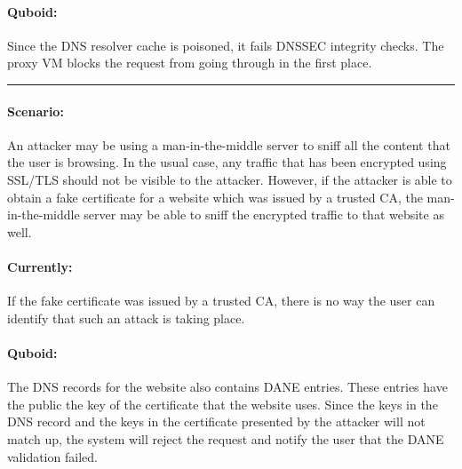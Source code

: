 \paragraph{Quboid:} Since the DNS resolver cache is poisoned, it fails DNSSEC integrity checks. The proxy VM blocks the request from going through in the first place.

\noindent\rule[0.5ex]{\linewidth}{1pt}

\paragraph{Scenario:} An attacker may be using a man-in-the-middle server to sniff all the content that the user is browsing. In the usual case, any traffic that has been encrypted using SSL/TLS should not be visible to the attacker. However, if the attacker is able to obtain a fake certificate for a website which was issued by a trusted CA, the man-in-the-middle server may be able to sniff the encrypted traffic to that website as well.

\paragraph{Currently:} If the fake certificate was issued by a trusted CA, there is no way the user can identify that such an attack is taking place.

\paragraph{Quboid:} The DNS records for the website also contains DANE entries. These entries have the public the key of the certificate that the website uses. Since the keys in the DNS record and the keys in the certificate presented by the attacker will not match up, the system will reject the request and notify the user that the DANE validation failed.




